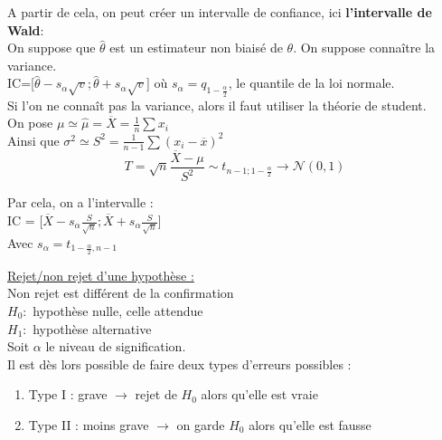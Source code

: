 \documentclass[../main.tex]{subfiles}
\begin{document}
A partir de cela, on peut créer un intervalle de confiance, ici \textbf{l'intervalle de Wald}: \\
On suppose que $\hat{\theta}$ est un estimateur non biaisé de $\theta$. On suppose connaître la variance.\\
IC=[$\hat{\theta}-s_{\alpha} \sqrt{v}; \hat{\theta}+s_{\alpha} \sqrt{v}$] où $s_{\alpha} = q_{1-\frac{\alpha}{2}}$, le quantile de la loi normale.\\

Si l'on ne connaît pas la variance, alors il faut utiliser la théorie de student.\\
On pose $\mu \simeq \hat{\mu} = \overline{X} = \frac{1}{n}\sum x_i$\\
Ainsi que $\sigma^2 \simeq S^2 = \frac{1}{n-1}\sum(x_i-\overline{x})^2$\\


\begin{equation}
    T = \sqrt{n} \frac{\overline{X}-\mu}{S^2} \sim t_{n-1; 1-\frac{\alpha}{2}} \rightarrow \mathcal{N}(0,1)
\end{equation}

Par cela, on a l'intervalle : \\
IC = [$\overline{X}-s_{\alpha} \frac{S}{\sqrt{n}}; \overline{X}+s_{\alpha} \frac{S}{\sqrt{n}}$]\\

Avec $s_{\alpha} = t_{1-\frac{\alpha}{2}, n-1}$

\quad \underline{Rejet/non rejet d'une hypothèse :}\\
\warning Non rejet est différent de la confirmation\\

$H_0 : $ hypothèse nulle, celle attendue\\
$H_1 : $ hypothèse alternative\\
Soit $\alpha$ le niveau de signification.\\

Il est dès lors possible de faire deux types d'erreurs possibles : \\
\begin{enumerate}
    \item Type I : grave $\rightarrow$ rejet de $H_0$ alors qu'elle est vraie\\
    \item Type II : moins grave $\rightarrow$ on garde $H_0$ alors qu'elle est fausse\\
\end{enumerate}
\end{document}
